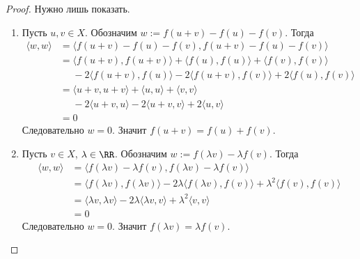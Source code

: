 \documentclass[12pt,a4paper]{article}
\begin{document}
    \begin{proof}
        Нужно лишь показать.
        \begin{enumerate}
            \item Пусть $u, v \in X$. Обозначим $w := f(u + v) - f(u) - f(v)$. Тогда
                \begin{align*}
                    \langle w, w \rangle
                    &= \langle f(u + v) - f(u) - f(v), f(u + v) - f(u) - f(v) \rangle\\
                    &= \langle f(u + v), f(u + v) \rangle
                        + \langle f(u), f(u) \rangle
                        + \langle f(v), f(v) \rangle\\
                        &\phantom{=} - 2\langle f(u + v), f(u) \rangle
                        - 2\langle f(u + v), f(v) \rangle
                        + 2\langle f(u), f(v) \rangle\\
                    &= \langle u + v, u + v \rangle
                        + \langle u, u \rangle
                        + \langle v, v \rangle\\
                        &\phantom{=} - 2\langle u + v, u \rangle
                        - 2\langle u + v, v \rangle
                        + 2\langle u, v \rangle\\
                    &= 0
                \end{align*}
                Следовательно $w = 0$. Значит $f(u + v) = f(u) + f(v)$.
            \item Пусть $v \in X$, $\lambda \in \RR$. Обозначим $w := f(\lambda v) - \lambda f(v)$. Тогда
                \begin{align*}
                    \langle w, w \rangle
                    &= \langle f(\lambda v) - \lambda f(v), f(\lambda v) - \lambda f(v) \rangle\\
                    &= \langle f(\lambda v), f(\lambda v) \rangle
                        - 2\lambda \langle f(\lambda v), f(v) \rangle
                        + \lambda^2 \langle f(v), f(v) \rangle\\
                    &= \langle \lambda v, \lambda v \rangle
                        - 2\lambda \langle \lambda v, v \rangle
                        + \lambda^2 \langle v, v \rangle\\
                    &= 0
                \end{align*}
                Следовательно $w = 0$. Значит $f(\lambda v) = \lambda f(v)$.
        \end{enumerate}
    \end{proof}
\end{document}
